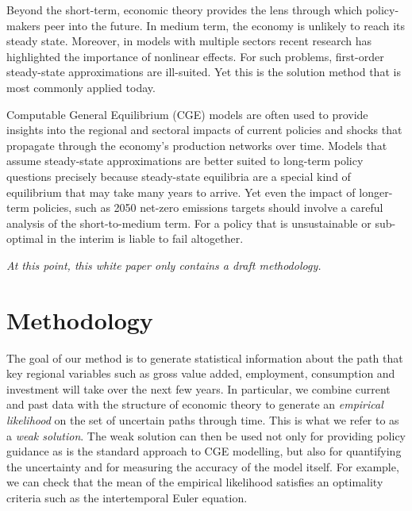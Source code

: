 \documentclass[12pt,a4paper,twoside, draft]{article}
\begin{document}
Beyond the short-term, economic theory provides the lens through which
policy-makers peer into the future. 
In medium term, the economy is unlikely to reach its steady state. 
Moreover, in models with multiple sectors recent research has highlighted
the importance of nonlinear effects.
For such problems, first-order steady-state approximations are ill-suited.
Yet this is the solution method that is most commonly applied today.

Computable General Equilibrium (CGE)
models are often used to provide insights into the regional and sectoral
impacts of current policies and shocks that propagate through the economy's
production networks over time.
Models that assume steady-state approximations are better suited to
long-term policy questions precisely because steady-state equilibria are a
special kind of equilibrium that may take many years to arrive.
Yet even the impact of longer-term policies, such as 2050 net-zero emissions
targets should involve a careful analysis of the short-to-medium term.
For a policy that is unsustainable or sub-optimal in the interim is liable to
fail altogether.

\emph{At this point, this white paper only contains a draft methodology.}

\section{Methodology}\label{sec-methodology}
The goal of our method is to generate statistical information about the path
that key regional variables such as gross value added, employment, consumption
and investment will take over the next few years.
In particular, we combine current and past data with the structure of economic
theory to generate an \emph{empirical likelihood}
\citet{Owen-Empirical_likelihood} on the set of uncertain
paths through time. This is what we refer to as a \emph{weak solution}.
The weak solution can then be used not only for providing policy guidance as is
the standard approach to CGE modelling, but also for quantifying the
uncertainty and for measuring the accuracy of the model itself.
For example, we can check that the mean of the empirical likelihood
satisfies an optimality criteria such as the intertemporal Euler equation. 
\end{document}
